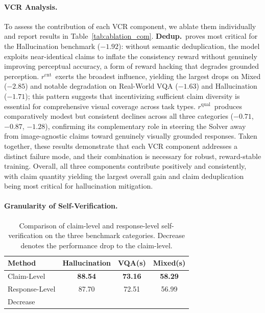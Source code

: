 \paragraph{VCR Analysis.}

To assess the contribution of each VCR component, we ablate them individually and report results in Table~\ref{tab:ablation_com}.
\textbf{Dedup.}\ proves most critical for the Hallucination benchmark ($-1.92$): without semantic deduplication, the model exploits near-identical claims to inflate the consistency reward without genuinely improving perceptual accuracy, a form of reward hacking that degrades grounded perception.
\textbf{$r^{\mathrm{cnt}}$}\ exerts the broadest influence, yielding the largest drops on Mixed ($-2.85$) and notable degradation on Real-World VQA ($-1.63$) and Hallucination ($-1.71$); this pattern suggests that incentivizing sufficient claim diversity is essential for comprehensive visual coverage across task types.
\textbf{$r^{\mathrm{qual}}$}\ produces comparatively modest but consistent declines across all three categories ($-0.71$, $-0.87$, $-1.28$), confirming its complementary role in steering the Solver away from image-agnostic claims toward genuinely visually grounded responses.
Taken together, these results demonstrate that each VCR component addresses a distinct failure mode, and their combination is necessary for robust, reward-stable training.
Overall, all three components contribute positively and consistently, with claim quantity yielding the largest overall gain and claim deduplication being most critical for hallucination mitigation.

\paragraph{Granularity of Self-Verification.}

\begin{table}
\centering
\vspace{-\intextsep}
\caption{
Comparison of claim-level and response-level self-verification on the three benchmark categories.
Decrease denotes the performance drop to the claim-level.
}
\label{tab:claim_vs_response}
\small
\begin{tabular}{l*{3}{S[table-format=2.2,table-column-width=1.4cm]}}
\toprule
Method & {Hallucination} & {VQA(s)} & {Mixed(s)} \\
\midrule
Claim-Level           & \textbf{88.54} & \textbf{73.16} & \textbf{58.29} \\
Response-Level  & 87.70 & 72.51 & 56.99 \\
\midrule
{}Decrease        &  &  &  \\
\bottomrule
\end{tabular}
\end{table}

